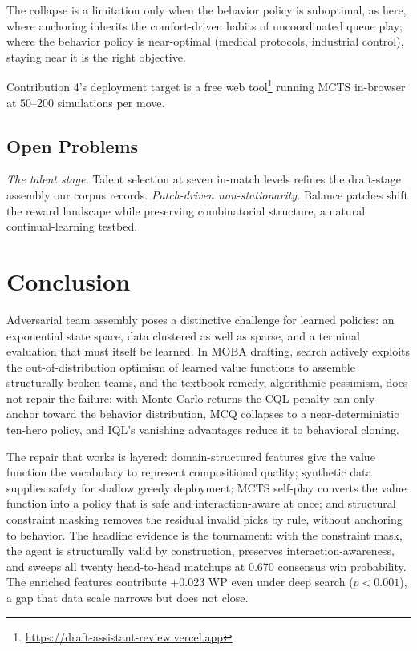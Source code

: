\documentclass[journal]{IEEEtran}
\newcommand{\deployurl}{\url{https://draft-assistant-review.vercel.app}}
\begin{document}
The collapse is a limitation only when the behavior policy is suboptimal, as here, where anchoring inherits the comfort-driven habits of uncoordinated queue play; where the behavior policy is near-optimal (medical protocols, industrial control), staying near it is the right objective.

Contribution 4's deployment target is a free web tool\footnote{\deployurl} running MCTS in-browser at 50--200 simulations per move.

\subsection{Open Problems}
\label{sec:open}

\textit{The talent stage.} Talent selection at seven in-match levels refines the draft-stage assembly our corpus records. \textit{Patch-driven non-stationarity.} Balance patches shift the reward landscape while preserving combinatorial structure, a natural continual-learning testbed.
\section{Conclusion}

Adversarial team assembly poses a distinctive challenge for learned policies: an exponential state space, data clustered as well as sparse, and a terminal evaluation that must itself be learned. In MOBA drafting, search actively exploits the out-of-distribution optimism of learned value functions to assemble structurally broken teams, and the textbook remedy, algorithmic pessimism, does not repair the failure: with Monte Carlo returns the CQL penalty can only anchor toward the behavior distribution, MCQ collapses to a near-deterministic ten-hero policy, and IQL's vanishing advantages reduce it to behavioral cloning.

The repair that works is layered: domain-structured features give the value function the vocabulary to represent compositional quality; synthetic data supplies safety for shallow greedy deployment; MCTS self-play converts the value function into a policy that is safe and interaction-aware at once; and structural constraint masking removes the residual invalid picks by rule, without anchoring to behavior. The headline evidence is the tournament: with the constraint mask, the agent is structurally valid by construction, preserves interaction-awareness, and sweeps all twenty head-to-head matchups at 0.670 consensus win probability. The enriched features contribute +0.023 WP even under deep search ($p < 0.001$), a gap that data scale narrows but does not close.
\end{document}
